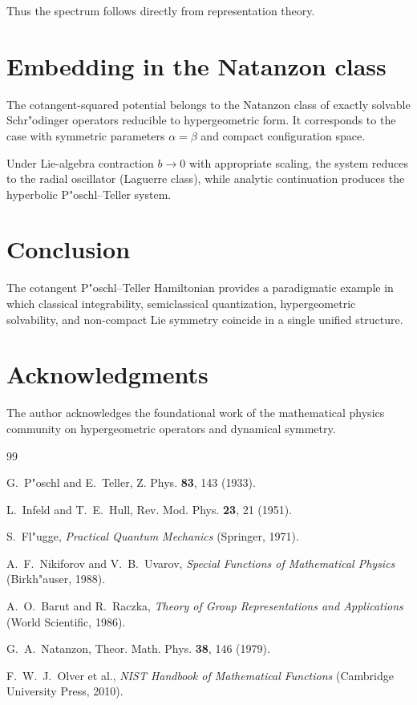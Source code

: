 \documentclass[11pt]{article}
\begin{document}
Thus the spectrum follows directly from representation theory.

\section{Embedding in the Natanzon class}

The cotangent-squared potential belongs to the Natanzon class of
exactly solvable Schr"odinger operators reducible to hypergeometric
form. It corresponds to the case with symmetric parameters
$\alpha=\beta$ and compact configuration space.

Under Lie-algebra contraction $b\to0$ with appropriate scaling,
the system reduces to the radial oscillator (Laguerre class), while
analytic continuation produces the hyperbolic P"oschl--Teller system.

\section{Conclusion}

The cotangent P"oschl--Teller Hamiltonian provides a paradigmatic
example in which classical integrability, semiclassical quantization,
hypergeometric solvability, and non-compact Lie symmetry coincide in a
single unified structure.

\section*{Acknowledgments}

The author acknowledges the foundational work of the mathematical
physics community on hypergeometric operators and dynamical symmetry.

\begin{thebibliography}{99}

G.~P"oschl and E.~Teller,
Z. Phys. \textbf{83}, 143 (1933).

L.~Infeld and T.~E.~Hull,
Rev. Mod. Phys. \textbf{23}, 21 (1951).

S.~Fl"ugge,
\textit{Practical Quantum Mechanics}
(Springer, 1971).

A.~F.~Nikiforov and V.~B.~Uvarov,
\textit{Special Functions of Mathematical Physics}
(Birkh"auser, 1988).

A.~O.~Barut and R.~Raczka,
\textit{Theory of Group Representations and Applications}
(World Scientific, 1986).

G.~A.~Natanzon,
Theor. Math. Phys. \textbf{38}, 146 (1979).

F.~W.~J.~Olver et al.,
\textit{NIST Handbook of Mathematical Functions}
(Cambridge University Press, 2010).

\end{thebibliography}
\end{document}
